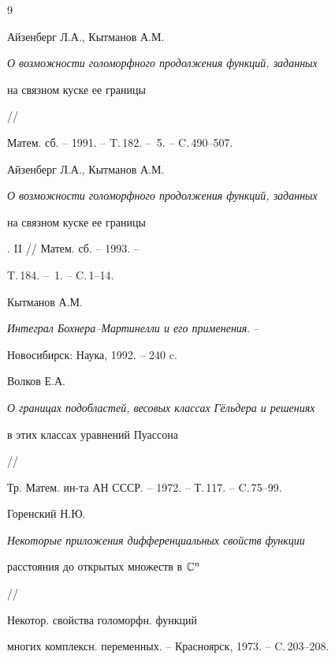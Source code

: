 \begin{thebibliography}{9}







Айзенберг Л.А., Кытманов А.М.


{\em О возможности голоморфного продолжения функций, заданных


на связном куске ее границы} //


Матем. сб. -- 1991. -- T.\,182. -- \No\,5. -- C.\,490--507.




Айзенберг Л.А., Кытманов А.М.


{\em О возможности голоморфного продолжения функций, заданных


на связном куске ее границы}. II // Матем. сб. -- 1993. --


T.\,184. -- \No\,1. -- C.\,1--14.




Кытманов А.М.


{\em Интеграл Бохнера--Мартинелли и его применения}. --


Новосибирск: Наука, 1992. -- 240 c.




Волков Е.А.


{\em О границах подобластей, весовых классах Г\"ельдера и решениях


в этих классах уравнений Пуассона} //


Тр. Матем. ин-та АН СССР. -- 1972. -- Т.\,117. -- C.\,75--99.




Горенский Н.Ю.


{\em Некоторые приложения дифференциальных свойств функции


расстояния до открытых множеств в $\Bbb C^n$}// 


Некотор. свойства голоморфн. функций


многих комплексн. переменных. -- Красноярск, 1973. -- C.\,203--208.





\end{thebibliography}





\vskip 0.5cm












\label{end}








